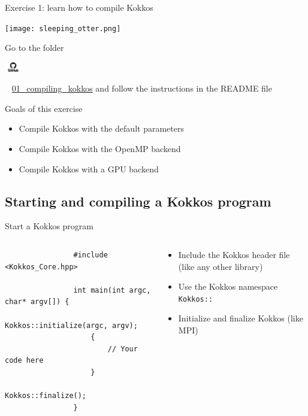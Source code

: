 \documentclass[aspectratio=169]{beamer}
\newcommand{\githublink}[2][2em]{%
    \hspace{-0.25em}%
    \parbox[c][#1][c]{#1}{%
        \includegraphics[width=#1]{GitHub-logo.png}%
    }%
    \hspace{-0.25em}%
    ~%
    #2%
}
\begin{document}

\begin{frame}{Exercise 1: learn how to compile Kokkos}
    \begin{center}
    \texttt{[image: sleeping\_otter.png]}
    \end{center}

    Go to the folder \githublink{\href{https://github.com/CExA-project/cexa-kokkos-tutorials/tree/main/exercises/01_compiling_kokkos}{01\_compiling\_kokkos}} and follow the instructions in the README file

    \begin{block}{Goals of this exercise}
        \begin{itemize}
            \item Compile Kokkos with the default parameters
            \item Compile Kokkos with the OpenMP backend
            \item Compile Kokkos with a GPU backend
        \end{itemize}
    \end{block}
\end{frame}


\subsection[Starting a Kokkos program]{Starting and compiling a Kokkos program}


\begin{frame}[fragile]{Start a Kokkos program}
    \begin{columns}
        \begin{column}{0.6\linewidth}
            \begin{verbatim}
                #include <Kokkos_Core.hpp>

                int main(int argc, char* argv[]) {
                    Kokkos::initialize(argc, argv);
                    {
                        // Your code here
                    }
                    Kokkos::finalize();
                }
            \end{verbatim}
        \end{column}
        \begin{column}{0.4\linewidth}
            \begin{itemize}
                \item Include the Kokkos header file (like any other library)
                \item Use the Kokkos namespace \texttt{Kokkos::}
                \item Initialize and finalize Kokkos (like MPI)
            \end{itemize}
        \end{column}
    \end{columns}
\end{frame}
\end{document}
